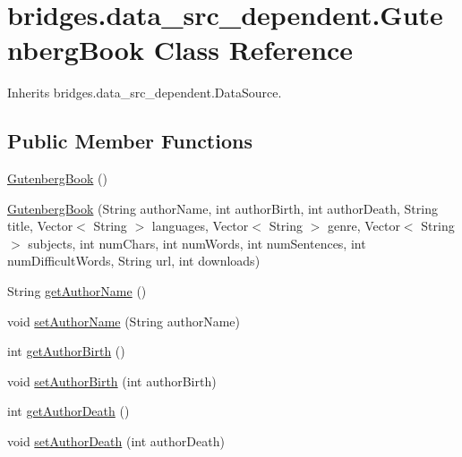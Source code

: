 \hypertarget{classbridges_1_1data__src__dependent_1_1_gutenberg_book}{}\section{bridges.\+data\+\_\+src\+\_\+dependent.\+Gutenberg\+Book Class Reference}
\label{classbridges_1_1data__src__dependent_1_1_gutenberg_book}


Inherits bridges.\+data\+\_\+src\+\_\+dependent.\+Data\+Source.

\subsection*{Public Member Functions}
\begin{DoxyCompactItemize}
\item 
\mbox{\hyperlink{classbridges_1_1data__src__dependent_1_1_gutenberg_book_a34e237fe23613dad17e4b5e005077927}{Gutenberg\+Book}} ()
\item 
\mbox{\hyperlink{classbridges_1_1data__src__dependent_1_1_gutenberg_book_ab35292d8e1464ce388326cafe29ed713}{Gutenberg\+Book}} (String author\+Name, int author\+Birth, int author\+Death, String title, Vector$<$ String $>$ languages, Vector$<$ String $>$ genre, Vector$<$ String $>$ subjects, int num\+Chars, int num\+Words, int num\+Sentences, int num\+Difficult\+Words, String url, int downloads)
\item 
String \mbox{\hyperlink{classbridges_1_1data__src__dependent_1_1_gutenberg_book_a8f66ba5bea27dbecb1658add3a278e45}{get\+Author\+Name}} ()
\item 
void \mbox{\hyperlink{classbridges_1_1data__src__dependent_1_1_gutenberg_book_a6d6e1ccac0fc2e0b09aa6ac6fbe727bc}{set\+Author\+Name}} (String author\+Name)
\item 
int \mbox{\hyperlink{classbridges_1_1data__src__dependent_1_1_gutenberg_book_a00e6f487af339abaa5eb83d315abc3c6}{get\+Author\+Birth}} ()
\item 
void \mbox{\hyperlink{classbridges_1_1data__src__dependent_1_1_gutenberg_book_ad54dbb22312e98761ae3d19f3b94ff85}{set\+Author\+Birth}} (int author\+Birth)
\item 
int \mbox{\hyperlink{classbridges_1_1data__src__dependent_1_1_gutenberg_book_aa1b308207d35f65ceaf85a6bc919d0da}{get\+Author\+Death}} ()
\item 
void \mbox{\hyperlink{classbridges_1_1data__src__dependent_1_1_gutenberg_book_af9aef84c74d681c1a41cbc37698ced18}{set\+Author\+Death}} (int author\+Death)

\end{DoxyCompactItemize}

